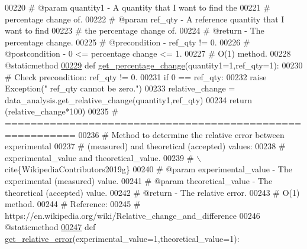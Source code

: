 \begin{DoxyCode}
{00220     \textcolor{comment}{#   @param quantity1 - A quantity that I want to find the}
00221     \textcolor{comment}{#       percentage change of.}
00222     \textcolor{comment}{#   @param ref\_qty - A reference quantity that I want to find}
00223     \textcolor{comment}{#       the percentage change of.}
00224     \textcolor{comment}{#   @return - The percentage change.}
00225     \textcolor{comment}{#   @precondition - ref\_qty != 0.}
00226     \textcolor{comment}{#   @postcondition - 0 <= percentage change <= 1.}
00227     \textcolor{comment}{#   O(1) method.}
00228     @staticmethod
\hypertarget{data__analysis__tool_8py_source_l00229}{}\hyperlink{classstatistics_1_1data__analysis__tool_1_1data__analysis_ae013c86ec44948a2b9ac2798bd4a9cb2}{00229}     \textcolor{keyword}{def }\hyperlink{classstatistics_1_1data__analysis__tool_1_1data__analysis_ae013c86ec44948a2b9ac2798bd4a9cb2}{get\_percentage\_change}(quantity1=1,ref\_qty=1):
00230         \textcolor{comment}{# Check precondition: ref\_qty != 0.}
00231         \textcolor{keywordflow}{if} 0 == ref\_qty:
00232             \textcolor{keywordflow}{raise} Exception(\textcolor{stringliteral}{"   ref\_qty cannot be zero."})
00233         relative\_change = data\_analysis.get\_relative\_change(quantity1,ref\_qty)
00234         \textcolor{keywordflow}{return} (relative\_change*100)
00235     \textcolor{comment}{# =========================================================}
00236     \textcolor{comment}{#   Method to determine the relative error between experimental}
00237     \textcolor{comment}{#       (measured) and theoretical (accepted) values:}
00238     \textcolor{comment}{#       experimental\_value and theoretical\_value.}
00239     \textcolor{comment}{#   \(\backslash\)cite\{WikipediaContributors2019g\}}
00240     \textcolor{comment}{#   @param experimental\_value - The experimental (measured) value.}
00241     \textcolor{comment}{#   @param theoretical\_value - The theoretical (accepted) value.}
00242     \textcolor{comment}{#   @return - The relative error.}
00243     \textcolor{comment}{#   O(1) method.}
00244     \textcolor{comment}{#   Reference:}
00245     \textcolor{comment}{#       https://en.wikipedia.org/wiki/Relative\_change\_and\_difference}
00246     @staticmethod
\hypertarget{data__analysis__tool_8py_source_l00247}{}\hyperlink{classstatistics_1_1data__analysis__tool_1_1data__analysis_aac1f458b15db107e27de367591361884}{00247}     \textcolor{keyword}{def }\hyperlink{classstatistics_1_1data__analysis__tool_1_1data__analysis_aac1f458b15db107e27de367591361884}{get\_relative\_error}(experimental\_value=1,theoretical\_value=1):
}
\end{DoxyCode}
